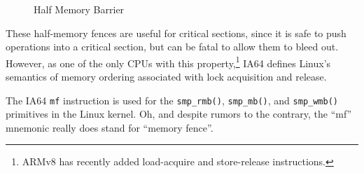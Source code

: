 \begin{figure}[tb]
\begin{center}
\end{center}
\caption{Half Memory Barrier}
\end{figure}

These half-memory fences are useful for critical sections, since
it is safe to push operations into a critical section, but can be
fatal to allow them to bleed out.
However, as one of the only CPUs with this property,\footnote{
	ARMv8 has recently added load-acquire and store-release instructions.}
IA64 defines
Linux's semantics of memory ordering associated with lock acquisition
and release.

The IA64 {\tt mf} instruction is used for the {\tt smp\_rmb()},
{\tt smp\_mb()}, and {\tt smp\_wmb()} primitives in the Linux kernel.
Oh, and despite rumors to the contrary, the ``mf'' mnemonic really
does stand for ``memory fence''.

